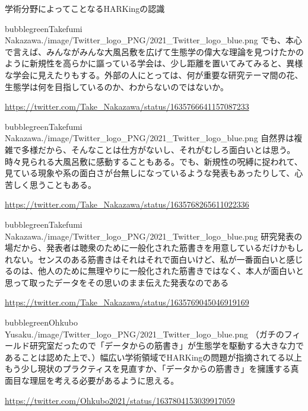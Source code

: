 \begin{SMbox}{学術分野によってことなるHARKingの認識}
 \begin{rightbubbles}{bubblegreen}{Takefumi Nakazawa}{./image/Twitter_logo_PNG/2021_Twitter_logo_blue.png}
  でも、本心で言えば、みんながみんな大風呂敷を広げて生態学の偉大な理論を見つけたかのように新規性を高らかに謳っている学会は、少し距離を置いてみてみると、異様な学会に見えたりもする。外部の人にとっては、何が重要な研究テーマ間の花、生態学は何を目指しているのか、わからないのではないか。
  \begin{flushright}
   \small	\url{https://twitter.com/Take_Nakazawa/status/1635766641157087233}
  \end{flushright}
 \end{rightbubbles}

 \begin{rightbubbles}{bubblegreen}{Takefumi Nakazawa}{./image/Twitter_logo_PNG/2021_Twitter_logo_blue.png}
  自然界は複雑で多様だから、そんなことは仕方がないし、それがむしろ面白いとは思う。時々見られる大風呂敷に感動することもある。でも、新規性の呪縛に捉われて、見ている現象や系の面白さが台無しになっているような発表もあったりして、心苦しく思うこともある。
  \begin{flushright}
   \small	\url{https://twitter.com/Take_Nakazawa/status/1635768265611022336}
  \end{flushright}    
 \end{rightbubbles}
 \begin{rightbubbles}{bubblegreen}{Takefumi Nakazawa}{./image/Twitter_logo_PNG/2021_Twitter_logo_blue.png}
  研究発表の場だから、発表者は聴衆のために一般化された筋書きを用意しているだけかもしれない。センスのある筋書きはそれはそれで面白いけど、私が一番面白いと感じるのは、他人のために無理やりに一般化された筋書きではなく、本人が面白いと思って取ったデータをその思いのまま伝えた発表なのである
  \begin{flushright} 
   \small	\url{https://twitter.com/Take_Nakazawa/status/1635769045046919169}
  \end{flushright}    
 \end{rightbubbles}

 \begin{rightbubbles}{bubblegreen}{Ohkubo Yusaku}{./image/Twitter_logo_PNG/2021_Twitter_logo_blue.png}
  （ガチのフィールド研究室だったので「データからの筋書き」が生態学を駆動する大きな力であることは認めた上で、）幅広い学術領域でHARKingの問題が指摘されてる以上もう少し現状のプラクティスを見直すか、「データからの筋書き」を擁護する真面目な理屈を考える必要があるように思える。
  \begin{flushright} 
   \small	\url{https://twitter.com/Ohkubo2021/status/1637804153039917059}
  \end{flushright}    
 \end{rightbubbles}


\end{SMbox}
